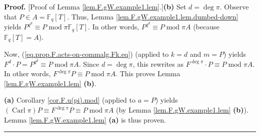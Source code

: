 \documentclass[numbers=enddot,12pt,final,onecolumn,notitlepage]{scrartcl}%
\theoremstyle{definition}
\newenvironment{proof}[1][Proof]{\noindent\textbf{#1.} }{\ \rule{0.5em}{0.5em}}
\begin{document}
\begin{proof}
[Proof of Lemma \ref{lem.F.gW.example1.lem}.]\textbf{(b)} Set $d=\deg\pi$.
Observe that $P\in A=\mathbb{F}_{q}\left[  T\right]  $. Thus, Lemma
\ref{lem.F.gW.example1.lem.dumbed-down} yields $P^{q^{d}}\equiv
P\operatorname{mod}\pi\mathbb{F}_{q}\left[  T\right]  $. In other words,
$P^{q^{d}}\equiv P\operatorname{mod}\pi A$ (because $\mathbb{F}_{q}\left[
T\right]  =A$).

Now, (\ref{eq.prop.F.acts-on-commalg.Fk.eq}) (applied to $k=d$ and $m=P$)
yields $F^{d}\cdot P=P^{q^{d}}\equiv P\operatorname{mod}\pi A$. Since
$d=\deg\pi$, this rewrites as $F^{\deg\pi}\cdot P\equiv P\operatorname{mod}\pi
A$. In other words, $F^{\deg\pi}P\equiv P\operatorname{mod}\pi A$. This proves
Lemma \ref{lem.F.gW.example1.lem} \textbf{(b)}.

\textbf{(a)} Corollary \ref{cor.F.u(pi).mod} (applied to $a=P$) yields
$\left(  \operatorname*{Carl}\pi\right)  P\equiv F^{\deg\pi}P\equiv
P\operatorname{mod}\pi A$ (by Lemma \ref{lem.F.gW.example1.lem} \textbf{(b)}).
Lemma \ref{lem.F.gW.example1.lem} \textbf{(a)} is thus proven.
\end{proof}
\end{document}
